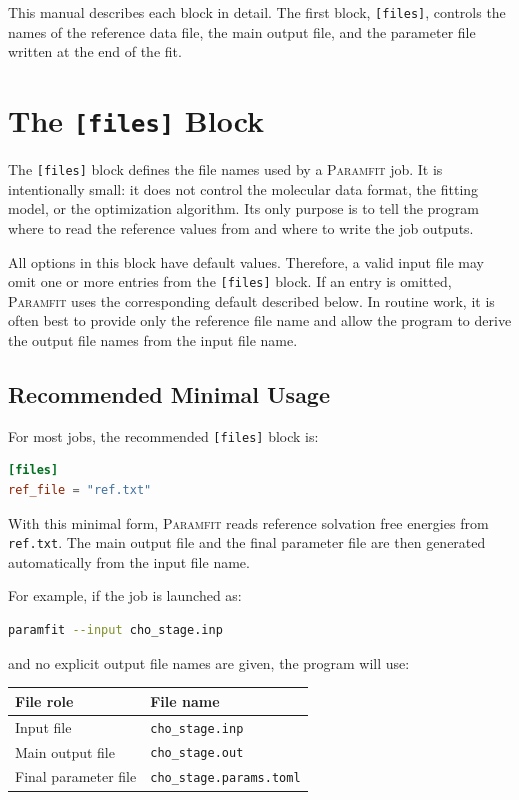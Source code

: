 \documentclass[11pt]{article}
\begin{document}
This manual describes each block in detail. The first block, \texttt{[files]},
controls the names of the reference data file, the main output file, and the
parameter file written at the end of the fit.

\section{The \texttt{[files]} Block}

The \texttt{[files]} block defines the file names used by a \textsc{Paramfit}
job. It is intentionally small: it does not control the molecular data format,
the fitting model, or the optimization algorithm. Its only purpose is to tell
the program where to read the reference values from and where to write the job
outputs.

All options in this block have default values. Therefore, a valid input file may
omit one or more entries from the \texttt{[files]} block. If an entry is omitted,
\textsc{Paramfit} uses the corresponding default described below. In routine
work, it is often best to provide only the reference file name and allow the
program to derive the output file names from the input file name.

\subsection{Recommended Minimal Usage}

For most jobs, the recommended \texttt{[files]} block is:

\begin{lstlisting}[language=toml]
[files]
ref_file = "ref.txt"
\end{lstlisting}

With this minimal form, \textsc{Paramfit} reads reference solvation free
energies from \texttt{ref.txt}. The main output file and the final parameter
file are then generated automatically from the input file name.

For example, if the job is launched as:

\begin{lstlisting}[language=bash]
paramfit --input cho_stage.inp
\end{lstlisting}

and no explicit output file names are given, the program will use:

\begin{center}
\begin{tabular}{ll}
\toprule
File role & File name \\
\midrule
Input file & \texttt{cho\_stage.inp} \\
Main output file & \texttt{cho\_stage.out} \\
Final parameter file & \texttt{cho\_stage.params.toml} \\
\bottomrule
\end{tabular}
\end{center}
\end{document}
